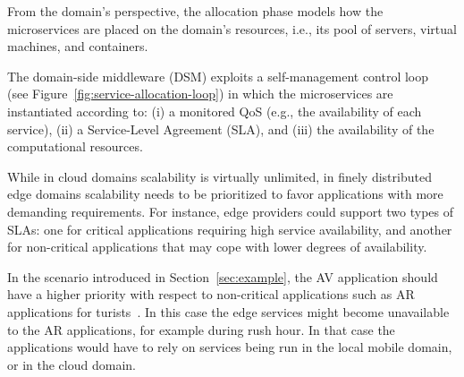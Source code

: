 From the domain's perspective, the allocation phase models how the microservices are placed on the domain's resources, i.e., its pool of servers, virtual machines, and containers.



The domain-side middleware (DSM) exploits a self-management control loop~\cite{kephart2003vision} (see Figure~\ref{fig:service-allocation-loop}) in which the microservices are instantiated according to: (i) a monitored QoS (e.g., the availability of each service), (ii) a Service-Level Agreement (SLA), and (iii) the availability of the computational resources. 


While in cloud domains scalability is virtually unlimited, in finely distributed edge domains scalability needs to be prioritized to favor applications with more demanding requirements. For instance, edge providers could support two types of SLAs: one for critical applications requiring high service availability, and another for non-critical applications that may cope with lower degrees of availability. 

In the scenario introduced in Section~\ref{sec:example}, the AV application should have a higher priority with respect to non-critical applications such as AR applications for turists~\cite{GarrigaMendonca2017}. In this case the edge services might become unavailable to the AR applications, for example during rush hour. In that case the applications would have to rely on services being run in the local mobile domain, or in the cloud domain. 


